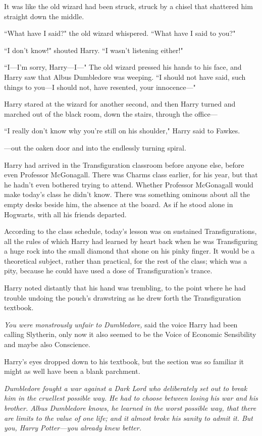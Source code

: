 It was like the old wizard had been struck, struck by a chisel that shattered him straight down the middle.

``What have I said?" the old wizard whispered. ``What have I said to you?"

``I don't know!" shouted Harry. ``I wasn't listening either!"

``I—I'm sorry, Harry—I—" The old wizard pressed his hands to his face, and Harry saw that Albus Dumbledore was weeping. ``I should not have said, such things to you—I should not, have resented, your innocence—"

Harry stared at the wizard for another second, and then Harry turned and marched out of the black room, down the stairs, through the office—

``I really don't know why you're still on his shoulder," Harry said to Fawkes.

—out the oaken door and into the endlessly turning spiral.

\later

Harry had arrived in the Transfiguration classroom before anyone else, before even Professor McGonagall. There was Charms class earlier, for his year, but that he hadn't even bothered trying to attend. Whether Professor McGonagall would make today's class he didn't know. There was something ominous about all the empty desks beside him, the absence at the board. As if he stood alone in Hogwarts, with all his friends departed.

According to the class schedule, today's lesson was on sustained Transfigurations, all the rules of which Harry had learned by heart back when he was Transfiguring a huge rock into the small diamond that shone on his pinky finger. It would be a theoretical subject, rather than practical, for the rest of the class; which was a pity, because he could have used a dose of Transfiguration's trance.

Harry noted distantly that his hand was trembling, to the point where he had trouble undoing the pouch's drawstring as he drew forth the Transfiguration textbook.

\emph{You were monstrously unfair to Dumbledore,} said the voice Harry had been calling Slytherin, only now it also seemed to be the Voice of Economic Sensibility and maybe also Conscience.

Harry's eyes dropped down to his textbook, but the section was so familiar it might as well have been a blank parchment.

\emph{Dumbledore fought a war against a Dark Lord who deliberately set out to break him in the cruellest possible way. He had to choose between losing his war and his brother. Albus Dumbledore knows, he learned in the worst possible way, that there are limits to the value of one life; and it almost broke his sanity to admit it. But you, Harry Potter—\emph{you} already knew better.}

